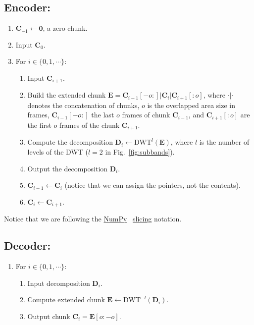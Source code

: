\subsection*{Encoder:}
\begin{enumerate}
\item ${\mathbf C}_{-1}\leftarrow{\mathbf 0}$, a zero chunk.
\item Input ${\mathbf C}_0$.
\item For $i\in\{0,1,\cdots\}$:   
  \begin{enumerate}               
  \item Input ${\mathbf C}_{i+1}$.
  \item Build the extended chunk ${\mathbf E}={\mathbf
    C}_{i-1}[-o:]|{\mathbf C}_i|{\mathbf C}_{i+1}[:o]$, where
    $\cdot|\cdot$ denotes the concatenation of chunks, $o$ is the
    overlapped area size in frames, ${\mathbf C}_{i-1}[-o:]$ the last
    $o$ frames of chunk ${\mathbf C}_{i-1}$, and ${\mathbf
      C}_{i+1}[:o]$ are the first $o$ frames of the chunk ${\mathbf
      C}_{i+1}$.
  \item Compute the decomposition ${\mathbf D}_i \leftarrow
    \text{DWT}^l({\mathbf E})$, where $l$ is the number of levels of
    the DWT ($l=2$ in Fig.~\ref{fig:subbands}).
  \item Output the decomposition ${\mathbf D}_i$.
  \item ${\mathbf C}_{i-1}\leftarrow {\mathbf C}_i$ (notice that we can assign the pointers, not the contents).
  \item ${\mathbf C}_i\leftarrow {\mathbf C}_{i+1}$.
  \end{enumerate}
\end{enumerate}

Notice that we are following the
\href{https://numpy.org/doc/stable/reference/}{NumPy}~\cite{numpy,harris2020array}
\href{https://www.pythoninformer.com/python-libraries/numpy/index-and-slice/}{slicing}
notation.


\subsection*{Decoder:}
\begin{enumerate}
\item For $i\in\{0,1,\cdots\}$:
  \begin{enumerate}
  \item Input decomposition ${\mathbf D}_i$.
  \item Compute extended chunk ${\mathbf E}\leftarrow\text{DWT}^{-l}({\mathbf D}_i)$.
  \item Output chunk ${\mathbf C}_i={\mathbf E}[o:-o]$.
  \end{enumerate}
\end{enumerate}


